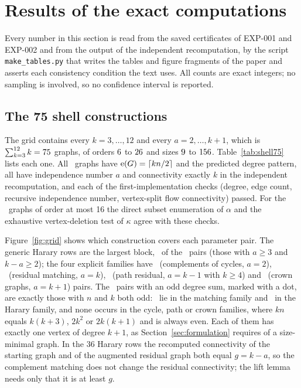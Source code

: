 \section{Results of the exact computations}\label{sec:results}

Every number in this section is read from the saved certificates of EXP-001 and EXP-002 and from the output of the independent recomputation, by the script \texttt{make\_tables.py} that writes the tables and figure fragments of the paper and asserts each consistency condition the text uses.
All counts are exact integers; no sampling is involved, so no confidence interval is reported.

\subsection{The 75 shell constructions}\label{sec:res-shell}

The grid contains every $k=3,\ldots,12$ and every $a=2,\ldots,k+1$, which is $\sum_{k=3}^{12}k=75$ graphs, of orders $6$ to $26$ and sizes $9$ to $156$.
Table~\ref{tab:shell75} lists each one.
All \NGraphs\ graphs have $\mathrm{e}(G)=\lceil kn/2\rceil$ and the predicted degree pattern, all have independence number $a$ and connectivity exactly $k$ in the independent recomputation, and each of the first-implementation checks (degree, edge count, recursive independence number, vertex-split flow connectivity) passed.
For the \NDirect\ graphs of order at most 16 the direct subset enumeration of $\alpha$ and the exhaustive vertex-deletion test of $\kappa$ agree with these checks.



Figure~\ref{fig:grid} shows which construction covers each parameter pair.
The generic Harary rows are the largest block, \NCaseHarary\ of the \NGraphs\ pairs (those with $a\ge3$ and $k-a\ge2$); the four explicit families have \NCaseCycle\ (complements of cycles, $a=2$), \NCaseMatching\ (residual matching, $a=k$), \NCasePath\ (path residual, $a=k-1$ with $k\ge4$) and \NCaseCrown\ (crown graphs, $a=k+1$) pairs.
The \NOdd\ pairs with an odd degree sum, marked with a dot, are exactly those with $n$ and $k$ both odd: \NOddMatching\ lie in the matching family and \NOddHarary\ in the Harary family, and none occurs in the cycle, path or crown families, where $kn$ equals $k(k+3)$, $2k^2$ or $2k(k+1)$ and is always even.
Each of them has exactly one vertex of degree $k+1$, as Section~\ref{sec:formulation} requires of a size-minimal graph.
In the 36 Harary rows the recomputed connectivity of the starting graph and of the augmented residual graph both equal $g=k-a$, so the complement matching does not change the residual connectivity; the lift lemma needs only that it is at least $g$.

